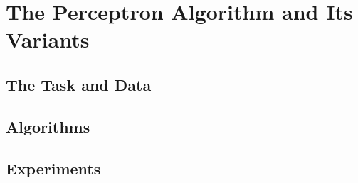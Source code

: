 \section{The Perceptron Algorithm and Its Variants}

\subsection{The Task and Data}

\subsection{Algorithms}

\subsection{Experiments}

